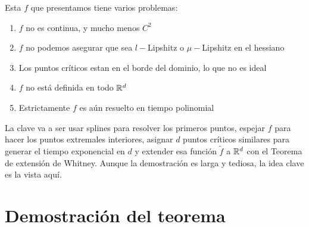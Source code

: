 \begin{remark}
	Esta $f$ que presentamos tiene varios problemas:
	
	\begin{enumerate}
		\item $f$ no es continua, y mucho menos $C^2$
		\item $f$ no podemos asegurar que sea $l-$Lipshitz o $\mu-$Lipshitz en el hessiano
		\item Los puntos cr\'iticos estan en el borde del dominio, lo que no es ideal
		\item $f$ no est\'a definida en todo ${\mathbb{R}}^d$
		\item Estrictamente $f$ es a\'un resuelto en tiempo polinomial
	\end{enumerate}
	
	La clave va a ser usar splines para resolver los primeros puntos, espejar $f$ para hacer los puntos extremales interiores, asignar $d$ puntos cr\'iticos similares para generar el tiempo exponencial en $d$ y extender esa funci\'on $\tilde{f}$ a ${\mathbb{R}}^d$ con el Teorema de extensi\'on de Whitney. Aunque la demostraci\'on es larga y tediosa, la idea clave es la vista aqu\'i.
\end{remark}

\section{Demostraci\'on del teorema}

